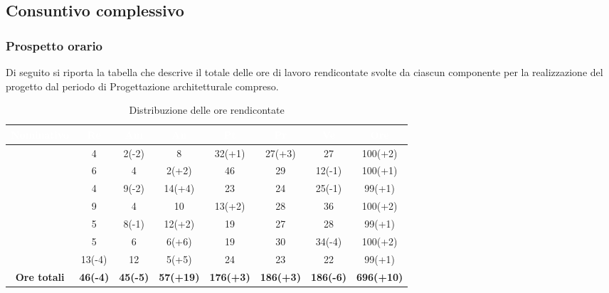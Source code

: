 \subsection{Consuntivo complessivo} \label{ConsuntivoComplessivo}
\subsubsection{Prospetto orario}
Di seguito si riporta la tabella che descrive il totale delle ore di lavoro rendicontate svolte da ciascun componente per la realizzazione del progetto dal periodo di Progettazione architetturale compreso.
\begin{table}[H]
	\begin{center}
		\begin{tabular}{ |c c c c c c c c| }
			\rowcolor{darkblue} 
			\textcolor{white}{\textbf{Nominativo}} & \textcolor{white}{\textbf{Re}} & \textcolor{white}{\textbf{Am}} & \textcolor{white}{\textbf{An}} & \textcolor{white}{\textbf{Pt}} & \textcolor{white}{\textbf{Pr}} & \textcolor{white}{\textbf{Ve}} & \textcolor{white}{\textbf{Ore}} \\ \hline
			\BL 	& 4  	& 2(-2)  	& 8 	& 32(+1) 	& 27(+3) 	& 27 	& 100(+2) \\ \hline
			\FF 	& 6 	& 4 	& 2(+2)		& 46 	& 29 	& 12(-1) 	& 100(+1) \\ \hline
			\MM 	& 4  	& 9(-2)  	& 14(+4) 	& 23 	& 24 	& 25(-1)  	& 99(+1) \\ \hline
			\PC 	& 9 	& 4  	& 10	& 13(+2) 	& 28	& 36 	& 100(+2) \\ \hline
			\TG 	& 5  	& 8(-1) 	& 12(+2) 	& 19 	& 27 	& 28 	& 99(+1) \\ \hline
			\TL 	& 5  	& 6 	& 6(+6) 	& 19 	& 30 	& 34(-4) 	& 100(+2) \\ \hline
			\VD 	& 13(-4)  	& 12  	& 5(+5)		& 24 	& 23 	& 22	& 99(+1) \\ \hline
			\textbf{Ore totali} & \textbf{46(-4)} & \textbf{45(-5)} & \textbf{57(+19)} & \textbf{176(+3)} & \textbf{186(+3)} & \textbf{186(-6)} & \textbf{696(+10)} \\ \hline
		\end{tabular}
		\caption{Distribuzione delle ore rendicontate}
	\end{center}
\end{table}
